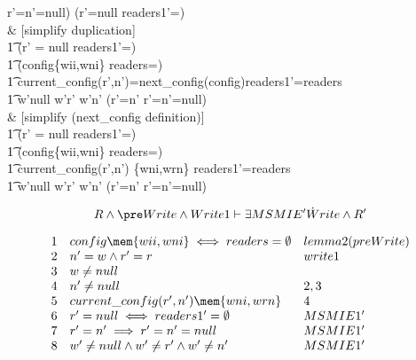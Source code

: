 \documentclass{article}
\begin{document}
\begin{argue}
r'=n'=null) \land (r'=null \iff readers1'=\emptyset)\land\\
\iff & [simplify duplication]\\
\t1 (r' = null \iff readers1'=\emptyset) \land\\
\t1 (config\mem \{wii,wni\} \iff readers=\emptyset) \land\\
\t1 current\_config(r',n')=next\_config(config)\land readers1'=readers\land\\
\t1 w'\neq null \land w'\neq r' \land w'\neq n' \land (r'=n' \implies
r'=n'=null)\\
\iff & [simplify (next\_config definition)]\\
\t1 (r' = null \iff readers1'=\emptyset) \land\\
\t1 (config\mem \{wii,wni\} \iff readers=\emptyset) \land\\
\t1 current\_config(r',n') \mem \{wni,wrn\} \land readers1'=readers\land\\
\t1 w'\neq null \land w'\neq r' \land w'\neq n' \land (r'=n' \implies
r'=n'=null) \\
\end{argue}



\[R \land \pre Write \land Write1 \vdash \exists MSMIE'\dot Write \land R'\]

\begin{displaymath}
\begin{array}{lll}
1 & config\mem \{wii,wni\} \iff readers=\emptyset & lemma2(preWrite)\\
2 & n' = w \land r'=r & write1\\
3 & w \neq null &\\
4 & n' \neq null & 2,3\\
5 & current\_config(r',n') \mem \{wni,wrn\} & 4\\
6 & r' = null \iff readers1'=\emptyset & MSMIE1'\\
7 & r'=n' \implies r'=n'=null & MSMIE1'\\
8 & w'\neq null \land w'\neq r' \land w'\neq n' & MSMIE1'\\
\end{array}
\end{displaymath}
\end{document}
